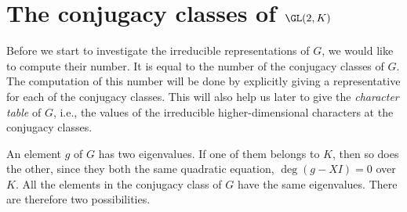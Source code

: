 \documentclass[../main.tex]{subfiles}
\begin{document}
\section{The conjugacy classes of \texorpdfstring{$\GL(2,K)$}{ GL(2,K)}}
Before we start to investigate the irreducible representations of $G$, we would like to compute their number. It is equal to the number of the conjugacy classes of $G$. The computation of this number will be done by explicitly giving a representative for each of the conjugacy classes. This will also help us later to give the \textit{character table} of $G$, i.e., the values of the irreducible higher-dimensional characters at the conjugacy classes.

An element $g$ of $G$ has two eigenvalues. If one of them belongs to $K$, then so does the other, since they both the same quadratic equation, $\deg(g-XI)=0$ over $K$. All the elements in the conjugacy class of $G$ have the same eigenvalues. There are therefore two possibilities.
\end{document}
